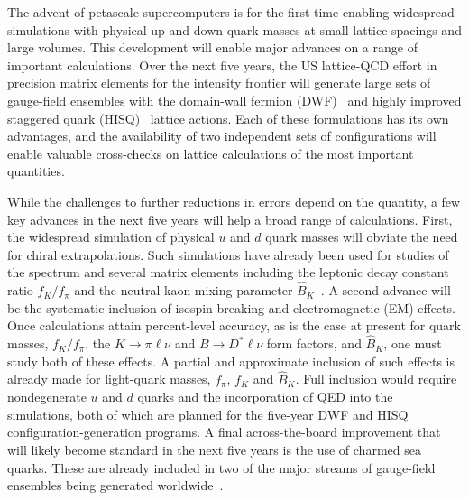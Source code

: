 The advent of petascale supercomputers is for the first time enabling
widespread simulations with physical up and down quark masses at small lattice
spacings and large volumes.  This development will enable major advances on a
range of important calculations.  Over the next five years, the US lattice-QCD
effort in precision matrix elements for the intensity frontier will generate
large sets of gauge-field ensembles with the domain-wall fermion
(DWF)~\cite{Kaplan:1992bt,Furman:1994ky,Vranas:2006zk} and highly improved
staggered quark (HISQ)~\cite{Follana:2006rc} lattice actions. Each of these
formulations has its own advantages, and the availability of two independent
sets of configurations will enable valuable cross-checks on lattice
calculations of the most important quantities.

While the challenges to further reductions in errors depend on the quantity, a
few key advances in the next five years will help a broad range of
calculations.  First, the widespread simulation of physical $u$ and $d$ quark
masses will obviate the need for chiral extrapolations.  Such simulations have
already been used for studies of the spectrum and several matrix elements
including the leptonic decay constant ratio $f_K/f_\pi$ and the neutral kaon
mixing parameter
$\hat{B}_K$~\cite{Aoki:2009ix,Durr:2010vn,Durr:2010aw,Bazavov:2013cp,Dowdall:2013rya}.
A second advance will be the systematic inclusion of isospin-breaking and
electromagnetic (EM) effects.  Once calculations attain percent-level
accuracy, as is the case at present for quark masses, $f_K/f_\pi$, the
$K\to\pi\ell\nu$ and $B\to D^*\ell\nu$ form factors, and $\hat B_K$, one must
study both of these effects.  A partial and approximate inclusion of such
effects is already made for light-quark masses, $f_\pi$, $f_K$ and $\hat B_K$.
Full inclusion would require nondegenerate $u$ and $d$ quarks and the
incorporation of QED into the simulations, both of which are planned for the
five-year DWF and HISQ configuration-generation programs.  A final
across-the-board improvement that will likely become standard in the next five
years is the use of charmed sea quarks.  These are already included in two of
the major streams of gauge-field ensembles being generated
worldwide~\cite{Baron:2009wt,Bazavov:2012xda}.

